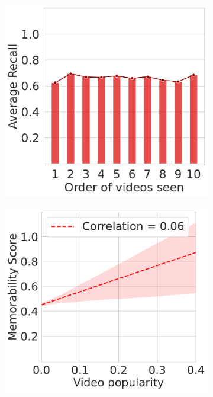 \begin{landscape}
\begin{figure}[]
\begin{subfigure}{0.3\textwidth}
        \caption{}
        \label{subfig:delay vs recall}
    \end{subfigure}
    \begin{subfigure}{0.3\textwidth}
        \centering
        \includegraphics[width=\textwidth]{images/avg_recall_by_position.pdf}
        \caption{}
        \label{subfig:avg recall by position}
    \end{subfigure}
    \begin{subfigure}{0.3\textwidth}
        \centering
        \includegraphics[width=\textwidth]{images/popularity_vs_recall.pdf}

\end{subfigure}
\end{figure}
\end{landscape}
